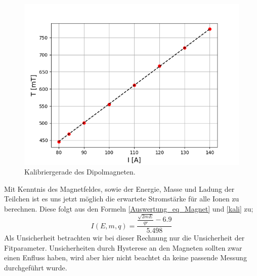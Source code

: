 \begin{figure}[ht]
  \centering
  \includegraphics[width=0.95\linewidth]{Pictures/magnet.png}
  \caption{Kalibriergerade des Dipolmagneten.}
  \label{Magnet_kali}
\end{figure}

Mit Kenntnis des Magnetfeldes, sowie der Energie, Masse und Ladung der Teilchen ist es uns jetzt möglich die erwartete Stromstärke für alle Ionen zu berechnen.
Diese folgt aus den Formeln \ref{Auswertung_eq_Magnet} und \ref{kali} zu;
\begin{equation}
I(E, m, q) = \frac{\frac{{\sqrt{2mE}}}{qr}-\num{6.9}}{\num{5.498}}
\label{HE_ion}
\end{equation}
Als Unsicherheit betrachten wir bei dieser Rechnung nur die Unsicherheit der Fitparameter.
Unsicherheiten durch Hysterese an den Magneten sollten zwar einen Enfluss haben, wird aber hier nicht beachtet da keine passende Messung durchgeführt wurde.

